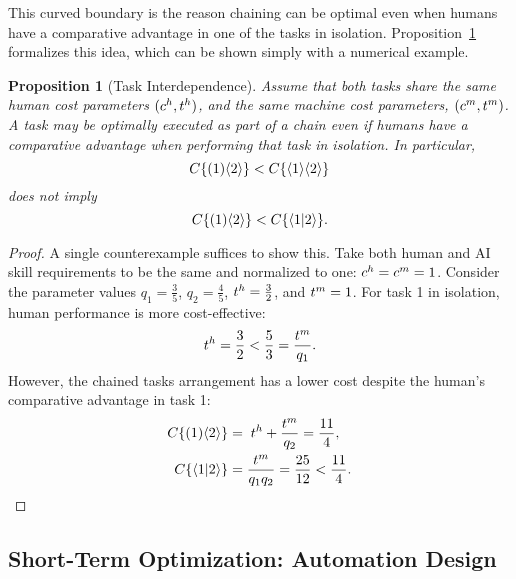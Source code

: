 \documentclass{article}
\theoremstyle{plain}
\theoremstyle{plain}
\newtheorem{proposition}{Proposition}
\begin{document}
This curved boundary is the reason chaining can be optimal even when humans have a comparative advantage in one of the tasks in isolation.
Proposition~\ref{proposition:interdependence} formalizes this idea, which can be shown simply with a numerical example.

\begin{proposition}[Task Interdependence] \label{proposition:interdependence}
Assume that both tasks share the same human cost parameters $(c^{h}_{}, t^{h}_{})$, and the same machine cost parameters, $(c^{m}_{}, t^{m}_{})$.
A task may be optimally executed as part of a chain even if humans have a comparative advantage when performing that task in isolation.
In particular,
\[
C\{ ( 1 )\langle 2 \rangle \} < C\{ \langle 1 \rangle\langle 2 \rangle \}
\]
does not imply
\[
C\{ ( 1 )\langle 2 \rangle \} < C\{ \langle 1|2 \rangle \}.
\]
\end{proposition}
\begin{proof}
A single counterexample suffices to show this.
Take both human and AI skill requirements to be the same and normalized to one: \(c^{h}_{} = c^{m}_{} = 1\).
Consider the parameter values $q_1 = \frac{3}{5}$, $q_2 = \frac{4}{5}$, $t^{h}_{} = \frac{3}{2}$, and $t^{m}_{} = 1$.
For task 1 in isolation, human performance is more cost-effective:
\[
t^{h}_{} = \frac{3}{2} < \frac{5}{3} = \frac{t^{m}_{}}{q_1}.
\]
However, the chained tasks arrangement has a lower cost despite the human's comparative advantage in task 1:
\begin{align*}
    C\{ ( 1 )\langle 2 \rangle \} &= \; t^{h}_{} + \frac{t^{m}_{}}{q_2} = \frac{11}{4}, \\
    C\{ \langle 1|2 \rangle \} &= \frac{t^{m}_{}}{q_1 q_2} = \frac{25}{12} < \frac{11}{4}.
\end{align*}
\end{proof}



\subsection{Short-Term Optimization: Automation Design}
\end{document}
